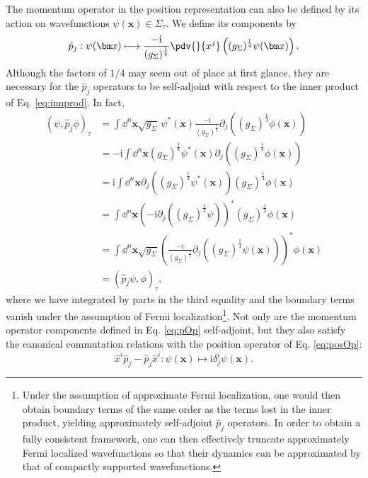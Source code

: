 \documentclass[letterpaper,12pt,titlepage,oneside,final]{book}
\newcommand{\ii}{\mathrm{i}}
\begin{document}
The momentum operator in the position representation can also be defined by its action on wavefunctions \mbox{$\psi(\bm x)\in\Sigma_\tau$}. We define its components by
\begin{equation}\label{eq:pOp}
    \hat{p}_j:\psi(\bm x) \longmapsto  \frac{- \ii}{(g_\Sigma)^\frac{1}{4}}\pdv{}{x^j} \left((g_\Sigma)^\frac{1}{4}\psi(\bm x)\right).
\end{equation}
Although the factors of $1/4$ may seem out of place at first glance, they are necessary for the $\hat{p}_j$ operators to be self-adjoint with respect to the inner product of Eq. \eqref{eq:innprod}. In fact,
\begin{align}
    (\psi,\hat{p}_j\phi)_\tau &=  \int\dd^n\bm x \sqrt{g_{\Sigma}}\,\psi^*(\bm x) \frac{-\ii}{(g_\Sigma)^\frac{1}{4}}\partial_j \left((g_\Sigma)^\frac{1}{4}\phi(\bm x)\right)\nonumber\\
    &= -\ii \int \dd^n\bm x(g_\Sigma)^\frac{1}{4} \psi^*(\bm x) \partial_j \left((g_\Sigma)^\frac{1}{4}\phi(\bm x)\right)\nonumber\\
    &= \ii \int \dd^n\bm x\partial_j\left((g_\Sigma)^\frac{1}{4} \psi^*(\bm x)\right) (g_\Sigma)^\frac{1}{4}\phi(\bm x)\nonumber\\
    &= \int \dd^n\bm x\left(-\ii\partial_j\left((g_\Sigma)^\frac{1}{4} \psi\right)\right)^* (g_\Sigma)^\frac{1}{4}\phi(\bm x)\nonumber\\
    &= \int \dd^n\bm x\sqrt{g_{\Sigma}}\left(\frac{-\ii}{(g_\Sigma)^\frac{1}{4}}\partial_j\left((g_\Sigma)^\frac{1}{4} \psi(\bm x)\right)\right)^* \!\!\phi(\bm x) \nonumber\\
    &= (\hat{p}_j \psi,\phi)_\tau,
\end{align}
where we have integrated by parts in the third equality and the boundary terms vanish under the assumption of Fermi localization\footnote{Under the assumption of approximate Fermi localization, one would then obtain boundary terms of the same order as the terms lost in the inner product, yielding approximately self-adjoint $\hat{p}_j$ operators. In order to obtain a fully consistent framework, one can then effectively truncate approximately Fermi localized wavefunctions so that their dynamics can be approximated by that of compactly supported wavefunctions.}. Not only are the momentum operator components defined in Eq. \eqref{eq:pOp} self-adjoint, but they also satisfy the canonical commutation relations with the position operator of Eq. \eqref{eq:posOp}:
\begin{equation}
    \hat{x}^i \hat{p}_j - \hat{p}_j \hat{x}^i : \psi(\bm x) \longmapsto \ii \delta^i_j\psi(\bm x).
\end{equation}
\end{document}
